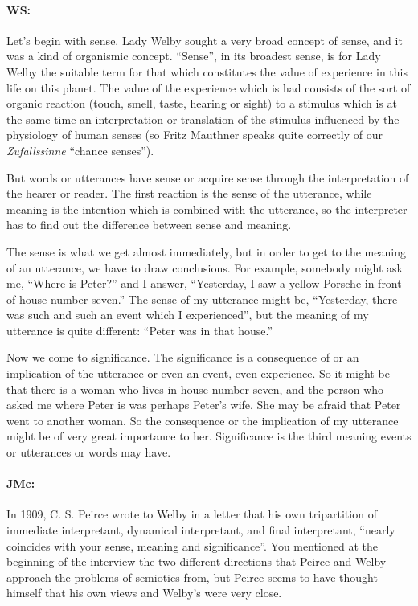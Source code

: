 \documentclass[output=paper]{langscibook}
\begin{document}
\paragraph*{WS:} Let’s begin with sense. Lady Welby sought a very broad concept of sense, and it was a kind of organismic concept. “Sense”, in its broadest sense, is for Lady Welby the suitable term for that which constitutes the value of experience in this life on this planet. The value of the experience which is had consists of the sort of organic reaction (touch, smell, taste, hearing or sight) to a stimulus which is at the same time an interpretation or translation of the stimulus influenced by the physiology of human senses (so Fritz Mauthner speaks quite correctly of our \textit{Zufallssinne} ``chance senses'').

\largerpage
But words or utterances have sense or acquire sense through the interpretation of the hearer or reader. The first reaction is the sense of the utterance, while meaning is the intention which is combined with the utterance, so the interpreter has to find out the difference between sense and meaning. 

The sense is what we get almost immediately, but in order to get to the meaning of an utterance, we have to draw conclusions. For example, somebody might ask me, ``Where is Peter?'' and I answer, ``Yesterday, I saw a yellow Porsche in front of house number seven.'' The sense of my utterance might be, ``Yesterday, there was such and such an event which I experienced'', but the meaning of my utterance is quite different: ``Peter was in that house.'' 

Now we come to significance. The significance is a consequence of or an implication of the utterance or even an event, even experience. So it might be that there is a woman who lives in house number seven, and the person who asked me where Peter is was perhaps Peter’s wife. She may be afraid that Peter went to another woman. So the consequence or the implication of my utterance might be of very great importance to her. Significance is the third meaning events or utterances or words may have.

\paragraph*{JMc:} In 1909, C. S. Peirce wrote to Welby in a letter that his own tripartition of immediate interpretant, dynamical interpretant, and final interpretant, ``nearly coincides with your sense, meaning and significance''. You mentioned at the beginning of the interview the two different directions that Peirce and Welby approach the problems of semiotics from, but Peirce seems to have thought himself that his own views and Welby’s were very close.
\end{document}
